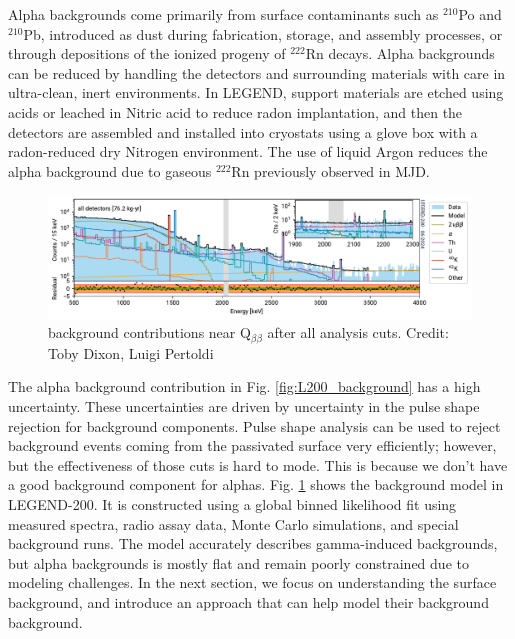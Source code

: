 Alpha backgrounds come primarily from surface contaminants such as $^{210}$Po and $^{210}$Pb, introduced as dust during fabrication, storage, and assembly processes, or through depositions of the ionized progeny of $^{222}$Rn decays. Alpha backgrounds can be reduced by handling the detectors and surrounding materials with care in ultra-clean, inert environments. In LEGEND, support materials are etched using acids or leached in Nitric acid to reduce radon implantation, and then the detectors are assembled and installed into cryostats using a glove box with a radon-reduced dry Nitrogen environment. The use of liquid Argon reduces the alpha background due to gaseous $^{222}$Rn previously observed in MJD.



\begin{figure}
\centering
  \includegraphics[width=0.99\linewidth]{ch2/figs/l200-bkgmodel-2_compressed.pdf}
  \caption{{\Ltwo} background contributions near Q$_{\beta\beta}$ after all analysis cuts. Credit: Toby Dixon, Luigi Pertoldi}
\label{ch2:fig:L200_background_model_fit}
  \end{figure}

  

 The alpha background contribution in Fig. \ref{fig:L200_background} has a  high uncertainty. These uncertainties are driven by uncertainty in the pulse shape rejection for background components. Pulse shape analysis can be used to reject background events coming from the passivated surface very efficiently; however, but the effectiveness of those cuts is hard to mode. This is because we don't have a good background component for alphas. Fig. \ref{ch2:fig:L200_background_model_fit} shows the background model in LEGEND-200. It is constructed using a global binned likelihood fit using measured spectra, radio assay data, Monte Carlo simulations, and special background runs. The model accurately describes gamma-induced backgrounds, but alpha backgrounds is mostly flat and remain poorly constrained due to modeling challenges. In the next section, we focus on understanding the surface background, and introduce an approach that can help model their background background.